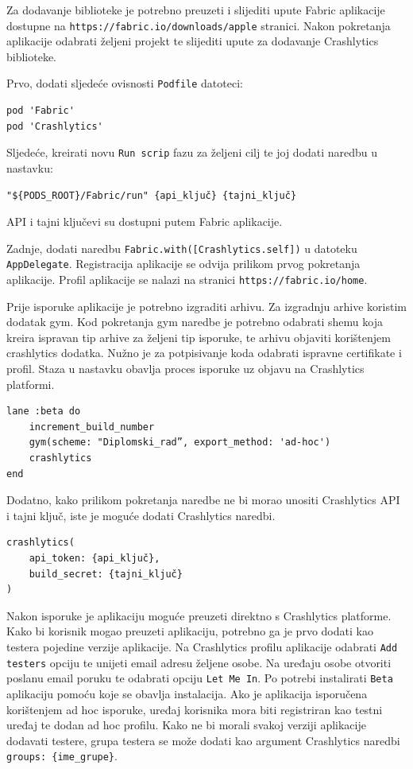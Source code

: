 \documentclass[times, utf8, diplomski, numeric]{fer}
\begin{document}
\begin{appendices}
Za dodavanje biblioteke je potrebno preuzeti i slijediti upute Fabric aplikacije dostupne na \verb|https://fabric.io/downloads/apple| stranici. Nakon pokretanja aplikacije odabrati željeni projekt te slijediti upute za dodavanje Crashlytics biblioteke.

Prvo, dodati sljedeće ovisnosti \verb|Podfile| datoteci:

\begin{verbatim}
pod 'Fabric'
pod 'Crashlytics'
\end{verbatim}

Sljedeće, kreirati novu \verb|Run scrip| fazu za željeni cilj te joj dodati naredbu u nastavku:

\begin{verbatim}
"${PODS_ROOT}/Fabric/run" {api_ključ} {tajni_ključ}
\end{verbatim}

API i tajni ključevi su dostupni putem Fabric aplikacije.

Zadnje, dodati naredbu \verb|Fabric.with([Crashlytics.self])| u datoteku \verb|AppDelegate|. Registracija aplikacije se odvija prilikom prvog pokretanja aplikacije. Profil aplikacije se nalazi na stranici \verb|https://fabric.io/home|.

Prije isporuke aplikacije je potrebno izgraditi arhivu. Za izgradnju arhive koristim dodatak gym. Kod pokretanja gym naredbe je potrebno odabrati shemu koja kreira ispravan tip arhive za željeni tip isporuke, te arhivu objaviti korištenjem crashlytics dodatka. Nužno je za potpisivanje koda odabrati ispravne certifikate i profil. Staza u nastavku obavlja proces isporuke uz objavu na Crashlytics platformi.

\begin{verbatim}
lane :beta do
    increment_build_number
    gym(scheme: "Diplomski_rad”, export_method: 'ad-hoc')
    crashlytics
end
\end{verbatim}

Dodatno, kako prilikom pokretanja naredbe ne bi morao unositi Crashlytics API i tajni ključ, iste je moguće dodati Crashlytics naredbi.

\begin{verbatim}
crashlytics(
    api_token: {api_ključ},
    build_secret: {tajni_ključ}
)
\end{verbatim}

Nakon isporuke je aplikaciju moguće preuzeti direktno s Crashlytics platforme. Kako bi korisnik mogao preuzeti aplikaciju, potrebno ga je prvo dodati kao testera pojedine verzije aplikacije. Na Crashlytics profilu aplikacije odabrati \verb|Add testers| opciju te unijeti email adresu željene osobe. Na uređaju osobe otvoriti poslanu email poruku te odabrati opciju \verb|Let Me In|. Po potrebi instalirati \verb|Beta| aplikaciju pomoću koje se obavlja instalacija. Ako je aplikacija isporučena korištenjem ad hoc isporuke, uređaj korisnika mora biti registriran kao testni uređaj te dodan ad hoc profilu. Kako ne bi morali svakoj verziji aplikacije dodavati testere, grupa testera se može dodati kao argument Crashlytics naredbi \verb|groups: {ime_grupe}|.



\end{appendices}
\end{document}
